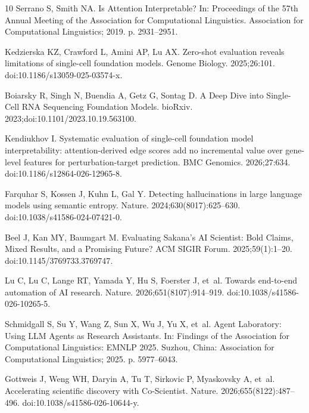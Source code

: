 \documentclass[10pt,letterpaper]{article}
\begin{document}
\begin{thebibliography}{10}
Serrano S, Smith NA.
\newblock Is Attention Interpretable?
\newblock In: Proceedings of the 57th Annual Meeting of the Association for
  Computational Linguistics. Association for Computational Linguistics; 2019.
  p. 2931--2951.

Kedzierska KZ, Crawford L, Amini AP, Lu AX.
\newblock Zero-shot evaluation reveals limitations of single-cell foundation
  models.
\newblock Genome Biology. 2025;26:101.
\newblock doi:{10.1186/s13059-025-03574-x}.

Boiarsky R, Singh N, Buendia A, Getz G, Sontag D.
\newblock A Deep Dive into Single-Cell {RNA} Sequencing Foundation Models.
\newblock bioRxiv. 2023;doi:{10.1101/2023.10.19.563100}.

Kendiukhov I.
\newblock Systematic evaluation of single-cell foundation model
  interpretability: attention-derived edge scores add no incremental value over
  gene-level features for perturbation-target prediction.
\newblock BMC Genomics. 2026;27:634.
\newblock doi:{10.1186/s12864-026-12965-8}.

Farquhar S, Kossen J, Kuhn L, Gal Y.
\newblock Detecting hallucinations in large language models using semantic
  entropy.
\newblock Nature. 2024;630(8017):625--630.
\newblock doi:{10.1038/s41586-024-07421-0}.

Beel J, Kan MY, Baumgart M.
\newblock Evaluating {Sakana's} {AI} {Scientist}: Bold Claims, Mixed Results,
  and a Promising Future?
\newblock ACM SIGIR Forum. 2025;59(1):1--20.
\newblock doi:{10.1145/3769733.3769747}.

Lu C, Lu C, Lange RT, Yamada Y, Hu S, Foerster J, et~al.
\newblock Towards end-to-end automation of {AI} research.
\newblock Nature. 2026;651(8107):914--919.
\newblock doi:{10.1038/s41586-026-10265-5}.

Schmidgall S, Su Y, Wang Z, Sun X, Wu J, Yu X, et~al.
\newblock Agent Laboratory: Using {LLM} Agents as Research Assistants.
\newblock In: Findings of the Association for Computational Linguistics: EMNLP
  2025. Suzhou, China: Association for Computational Linguistics; 2025. p.
  5977--6043.

Gottweis J, Weng WH, Daryin A, Tu T, Sirkovic P, Myaskovsky A, et~al.
\newblock Accelerating scientific discovery with {Co-Scientist}.
\newblock Nature. 2026;655(8122):487--496.
\newblock doi:{10.1038/s41586-026-10644-y}.


\end{thebibliography}
\end{document}
